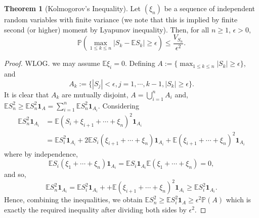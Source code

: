 \documentclass[]{article}
\theoremstyle{definition}
\newtheorem{theorem}{Theorem}
\theoremstyle{definition}
\begin{document}
\begin{theorem}[Kolmogorov's Inequality]
  Let \((\xi_n)\) be a sequence of independent random variables with finite 
  variance (we note that this is implied by finite second (or higher) moment 
  by Lyapunov inequality). Then, for all \(n \ge 1\), \(\epsilon > 0\), 
  \[\mathbb{P}\left(\max_{1 \le k \le n}|S_k - \mathbb{E}S_k| \ge \epsilon\right) \le 
    \frac{V_{S_n}}{\epsilon^2}.\]
\end{theorem}
\begin{proof}
  WLOG. we may assume \(\mathbb{E}\xi_i = 0\). Defining 
  \(A := \{\max_{1 \le k \le n} |S_k| \ge \epsilon\}\), and 
  \[A_k := \{|S_j| < \epsilon, j = 1, \cdots, k - 1, |S_k| \ge \epsilon\}.\]
  It is clear that \(A_k\) are mutually disjoint, \(A = \bigcup_{i = 1}^n A_i\) 
  and, \(\mathbb{E}S_n^2 \ge \mathbb{E} S_n^2 \mathbf{1}_A = 
  \sum_{i = 1}^n \mathbb{E}S_n^2 \mathbf{1}_{A_i}\). Considering 
  \[\begin{split}
    \mathbb{E}S_n^2 \mathbf{1}_{A_i} & = 
    \mathbb{E}(S_i + \xi_{i + 1} + \cdots + \xi_n)^2\mathbf{1}_{A_i}\\
    & = \mathbb{E}S_i^2\mathbf{1}_{A_i} + 2\mathbb{E}S_i(\xi_{i + 1} + \cdots + \xi_n)\mathbf{1}_{A_i}
      + \mathbb{E}(\xi_{i + 1} + \cdots + \xi_n)^2\mathbf{1}_{A_i}
  \end{split}\]
  where by independence, 
  \[\mathbb{E}S_i(\xi_1 + \cdots + \xi_n)\mathbf{1}_{A_i} = 
    \mathbb{E}S_i\mathbf{1}_{A_i}\mathbb{E}(\xi_1 + \cdots + \xi_n) = 0,\]
  and so, 
  \[\mathbb{E}S_n^2 \mathbf{1}_{A_i} = 
  \mathbb{E}S_i^2\mathbf{1}_{A_i} + 
  + \mathbb{E}(\xi_{i + 1} + \cdots + \xi_n)^2\mathbf{1}_{A_i} 
  \ge \mathbb{E}S_i^2\mathbf{1}_{A_i}.\]
  Hence, combining the inequalities, we obtain \(\mathbb{E}S_n^2 \ge 
  \mathbb{E}S_i^2 \mathbf{1}_{A} \ge \epsilon^2 \mathbb{P}(A)\) which is 
  exactly the required inequality after dividing both sides by \(\epsilon^2\).
\end{proof}
\end{document}
